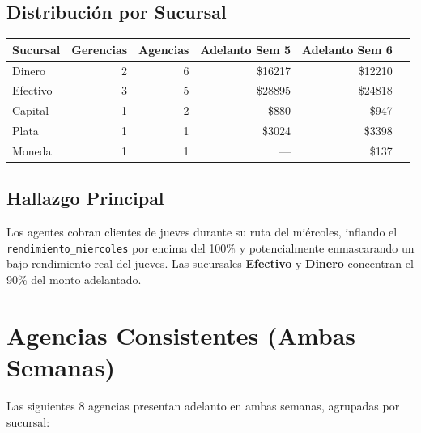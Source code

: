 \documentclass[11pt,a4paper]{article}
\newcommand{\money}[1]{\$\num{#1}}
\begin{document}
\subsection{Distribuci\'on por Sucursal}

\begin{center}
\renewcommand{\arraystretch}{1.3}
\begin{tabular}{lrrrrr}
\toprule
\textbf{Sucursal} & \textbf{Gerencias} & \textbf{Agencias}
  & \textbf{Adelanto Sem 5} & \textbf{Adelanto Sem 6} \\
\midrule
Dinero   & 2 & 6 & \money{16217} & \money{12210} \\
Efectivo & 3 & 5 & \money{28895} & \money{24818} \\
Capital  & 1 & 2 & \money{880}   & \money{947} \\
Plata    & 1 & 1 & \money{3024}  & \money{3398} \\
Moneda   & 1 & 1 & ---           & \money{137} \\
\bottomrule
\end{tabular}
\end{center}

\subsection{Hallazgo Principal}

Los agentes cobran clientes de jueves durante su ruta del mi\'ercoles, inflando
el \texttt{rendimiento\_miercoles} por encima del 100\% y potencialmente enmascarando
un bajo rendimiento real del jueves. Las sucursales \textbf{Efectivo} y \textbf{Dinero}
concentran el 90\% del monto adelantado.

\section{Agencias Consistentes (Ambas Semanas)}

Las siguientes 8 agencias presentan adelanto en ambas semanas, agrupadas por sucursal:
\end{document}

